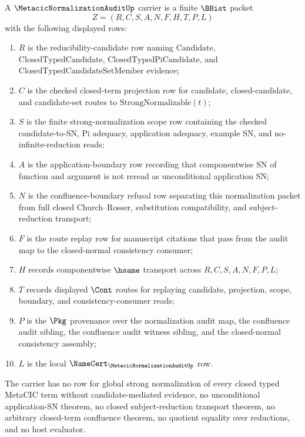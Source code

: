 \begin{definition}
\label{def:metacic-normalization-audit-carrier}
A $\MetacicNormalizationAuditUp$ carrier is a finite $\BHist$ packet
$$
Z=(R,C,S,A,N,F,H,T,P,L)
$$
with the following displayed rows:
\begin{enumerate}
\item $R$ is the reducibility-candidate row naming $\mathrm{Candidate}$, $\mathrm{ClosedTypedCandidate}$, $\mathrm{ClosedTypedPiCandidate}$, and $\mathrm{ClosedTypedCandidateSetMember}$ evidence;
\item $C$ is the checked closed-term projection row for candidate, closed-candidate, and candidate-set routes to $\mathrm{StrongNormalizable}(t)$;
\item $S$ is the finite strong-normalization scope row containing the checked candidate-to-SN, Pi adequacy, application adequacy, example SN, and no-infinite-reduction reads;
\item $A$ is the application-boundary row recording that componentwise SN of function and argument is not reread as unconditional application SN;
\item $N$ is the confluence-boundary refusal row separating this normalization packet from full closed Church--Rosser, substitution compatibility, and subject-reduction transport;
\item $F$ is the route replay row for manuscript citations that pass from the audit map to the closed-normal consistency consumer;
\item $H$ records componentwise $\hsame$ transport across $R,C,S,A,N,F,P,L$;
\item $T$ records displayed $\Cont$ routes for replaying candidate, projection, scope, boundary, and consistency-consumer reads;
\item $P$ is the $\Pkg$ provenance over the normalization audit map, the confluence audit sibling, the confluence audit witness sibling, and the closed-normal consistency assembly;
\item $L$ is the local $\NameCert_{\MetacicNormalizationAuditUp}$ row.
\end{enumerate}
The carrier has no row for global strong normalization of every closed typed MetaCIC term without candidate-mediated evidence, no unconditional application-SN theorem, no closed subject-reduction transport theorem, no arbitrary closed-term confluence theorem, no quotient equality over reductions, and no host evaluator.
\end{definition}

